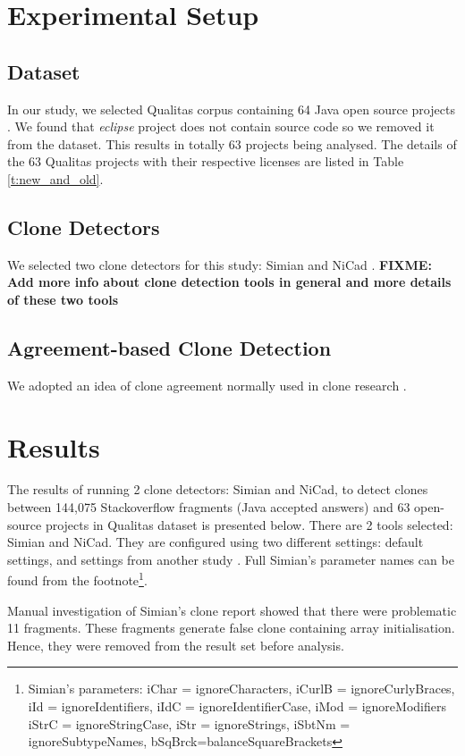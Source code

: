 \documentclass{sig-alternate-05-2015}
\newcommand\FIXME[1]{\textbf{FIXME: #1}}
\begin{document}
\section{Experimental Setup}

\subsection{Dataset}
In our study, we selected Qualitas corpus containing 64 Java open source projects \cite{QualitasCorpus}. We found that \textit{eclipse} project does not contain source code so we removed it from the dataset. This results in totally 63 projects being analysed. The details of the 63 Qualitas projects with their respective licenses are listed in Table \ref{t:new_and_old}.

\subsection{Clone Detectors}
We selected two clone detectors for this study: Simian \cite{simian} and NiCad \cite{Cordy,Roy2008}. \FIXME{Add more info about clone detection tools in general and more details of these two tools} 

\subsection{Agreement-based Clone Detection}
We adopted an idea of clone agreement normally used in clone research \cite{Wang2013,Funaro2010}.

\section{Results}
The results of running 2 clone detectors: Simian and NiCad, to detect clones between 144,075 Stackoverflow fragments (Java accepted answers) and 63 open-source projects in Qualitas dataset is presented below. There are 2 tools selected: Simian and NiCad. They are configured using two different settings: default settings, and settings from another study \cite{Wang2013}. Full Simian's parameter names can be found from the footnote\footnote{Simian's parameters: iChar = ignoreCharacters, iCurlB = ignoreCurlyBraces, iId = ignoreIdentifiers, iIdC = ignoreIdentifierCase, iMod = ignoreModifiers \newline iStrC = ignoreStringCase, iStr = ignoreStrings, iSbtNm = ignoreSubtypeNames, bSqBrck=balanceSquareBrackets}. 

Manual investigation of Simian's clone report showed that there were problematic 11 fragments. These fragments generate false clone containing array initialisation. Hence, they were removed from the result set before analysis.
\end{document}

